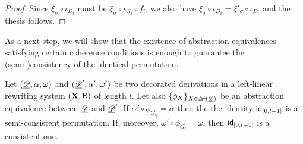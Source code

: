 \begin{proof}
	Since $\xi_\sigma \circ \iota_{D_i}$ must be $\xi_\sigma \circ \iota_{G_i}\circ f_i$, we also have
	$\xi_\sigma \circ \iota_{D_i}=\xi'_\sigma \circ \iota_{D_i}$
	and the thesis follows.
\end{proof}


As a next step, we will show that the existence of abstraction equivalences satisfying certain coherence conditions is enough to guarantee the (semi-)consistency of the identical permutation.

\begin{proposition}\label{rem:abscons}
	Let $(\underline{\mathscr{D}}, \alpha, \omega)$ and $(\underline{\mathscr{D}}', \alpha', \omega')$ be two decorated derivations in a left-linear rewriting system $(\textbf {\textup{X}}, \mathsf{R})$ of length $l$. Let also $\{\phi_X\}_{X\in \Delta^{\hspace{-1pt}\downarrow\hspace{-1pt}}(\underline{\mathscr{D}})}$ be an abstraction equivalence between $\underline{\mathscr{D}}$ and $\underline{\mathscr{D}}'$. If $\alpha'\circ \phi_{G_0}=\alpha$ then the the identity $\mathsf{id}_{[0,l-1]}$ is a semi-consistent permutation. If, moreover, $\omega'\circ \phi_{G_{l}}=\omega$, then $\mathsf{id}_{[0,l-1]}$ is a consistent one.
\end{proposition}
